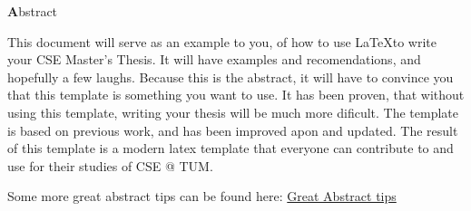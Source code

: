 

\clearemptydoublepage
{}
{}





\vspace*{2cm}
\begin{center}
{\Large \textbf Abstract}
\end{center}
\vspace{1cm}

This document will serve as an example to you, of how to use \LaTeX to write your
CSE Master's Thesis. It will have examples and recomendations, and hopefully a
few laughs.  Because this is the abstract, it will have to convince you that this 
template is something you want to use.  It has been proven, that without using
this template, writing your thesis will be much more dificult. The template is
based on previous work, and has been improved apon and updated.  The result of 
this template is a modern latex template that everyone can contribute to and use
for their studies of CSE @ TUM.

Some more great abstract tips can be found here: 
\href{https://users.ece.cmu.edu/~koopman/essays/abstract.html}{Great Abstract tips}
